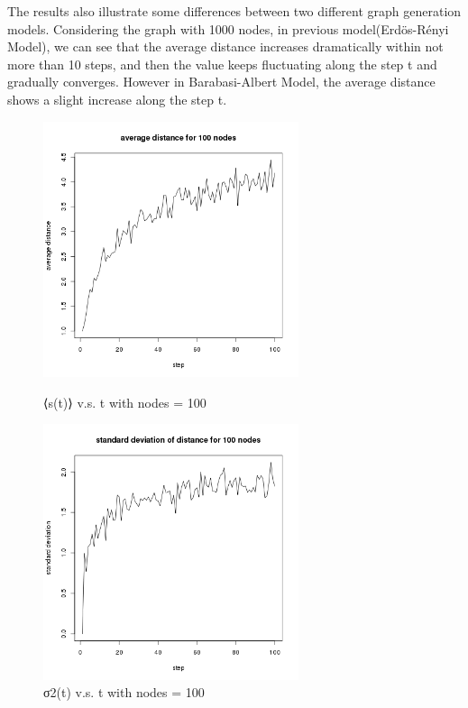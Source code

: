 \documentclass[draftcls,12pt,onecolumn]{IEEEtran}
\begin{document}
The results also illustrate some differences between two different graph generation models. Considering the graph with 1000 nodes, in previous model(Erdös-Rényi Model), we can see that the average distance increases dramatically within not more than 10 steps, and then the value keeps fluctuating along the step t and gradually converges. However in Barabasi-Albert Model, the average distance shows a slight increase along the step t.
\begin{figure}[htbp]
\centering
\begin{minipage}[t]{0.48\textwidth}
\centering
\includegraphics[width=7.5cm]{2_2_d_100_distance.png}
\caption{⟨s(t)⟩ v.s. t with nodes = 100}
\label{fig14}
\end{minipage}
\begin{minipage}[t]{0.48\textwidth}
\centering
\includegraphics[width=7.5cm]{2_2_d_100_deviation.png}
\caption{σ2(t) v.s. t with nodes = 100}
\label{fig15}
\end{minipage}
\end{figure}
\end{document}
